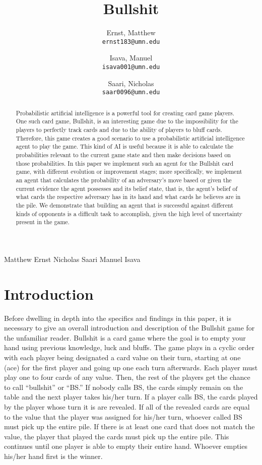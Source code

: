 \documentclass[a4paper,12pt]{article}
\author{
  Ernst, Matthew\\
  \texttt{ernst183@umn.edu}
  \and
 Isava, Manuel\\
  \texttt{isava001@umn.edu}
\and
  Saari, Nicholas\\
  \texttt{saar0096@umn.edu}
}
\title{Bullshit}
\begin{document}
\maketitle

Matthew Ernst
Nicholas Saari
Manuel Isava


\begin{abstract}
Probabilistic artificial intelligence is a powerful tool for creating card game players. One such card game, Bullshit, is an interesting game due to the impossibility for the players to perfectly track cards and due to the ability of players to bluff cards. Therefore, this game creates a good scenario to use a probabilistic artificial intelligence agent to play the game. This kind of AI is useful because it is able to calculate the probabilities relevant to the current game state and then make decisions based on those probabilities. In this paper we implement such an agent for the Bullshit card game, with different evolution or improvement stages; more specifically, we implement an agent that calculates the probability of an adversary’s move based or given the current evidence the agent possesses and its belief state, that is, the agent’s belief of what cards the respective adversary has in its hand and what cards he believes are in the pile. We demonstrate that building an agent that is successful against different kinds of opponents is a difficult task to accomplish, given the high level of uncertainty present in the game.
\end{abstract}

\section{Introduction}
	Before dwelling in depth into the specifics and findings in this paper, it is necessary to give an overall introduction and description of the Bullshit game for the unfamiliar reader. Bullshit is a card game where the goal is to empty your hand using previous knowledge, luck and bluffs. The game plays in a cyclic order with each player being designated a card value on their turn, starting at one (ace) for the first player and going up one each turn afterwards. Each player must play one to four cards of any value. Then, the rest of the players get the chance to call “bullshit” or “BS.”  If nobody calls BS, the cards simply remain on the table and the next player takes his/her turn. If a player calls BS, the  cards played by the player whose turn it is are revealed. If all of the revealed cards are equal to the value that the player was assigned for his/her turn, whoever called BS must pick up the entire pile. If there is at least one card that does not match the value, the player that played the cards must pick up the entire pile. This continues until one player is able to empty their entire hand. Whoever empties his/her hand first is the winner.
\end{document}
